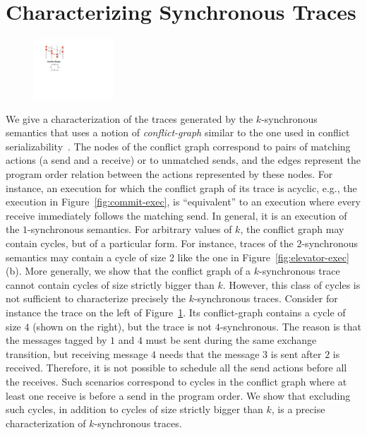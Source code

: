 \section{Characterizing Synchronous Traces}\label{sec:characterizations}

\begin{figure}
\vspace{-5mm}
\includegraphics[width=3cm]{ex-rs-cycle.pdf}
\caption{ }
\label{fig:ex-rs-cycle}
\vspace{-8mm}
\end{figure}
We give a characterization of the traces generated by the $k$-synchronous semantics that uses a notion of \emph{conflict-graph} similar to the one used in conflict serializability~\cite{journals/jacm/Papadimitriou79b}. The nodes of the conflict graph correspond to pairs of matching actions (a send and a receive) or to unmatched sends, and the edges represent the program order relation between the actions represented by these nodes. 
For instance, an execution for which the conflict graph of its trace is acyclic, e.g., the execution in Figure~\ref{fig:commit-exec}, is ``equivalent'' to an execution where every receive immediately follows the matching send. 
In general, it is an execution of the $1$-synchronous semantics. For arbitrary values of $k$, the conflict graph may contain cycles, but of a particular form. For instance, traces of the $2$-synchronous semantics may contain a cycle of size 2 like the one in Figure~\ref{fig:elevator-exec}(b). More generally, we show that the conflict graph of a $k$-synchronous trace cannot contain cycles of size strictly bigger than $k$. However, this class of cycles is not sufficient to characterize precisely the $k$-synchronous traces. Consider for instance the trace on the left of Figure~\ref{fig:ex-rs-cycle}. Its conflict-graph contains a cycle of size $4$ (shown on the right), but the trace is not $4$-synchronous. The reason is that the messages tagged by $1$ and $4$ must be sent during the same exchange transition, but receiving message $4$ needs that the message $3$ is sent after $2$ is received. Therefore, it is not possible to schedule all the send actions before all the receives. Such scenarios correspond to cycles in the conflict graph where at least one receive is before a send in the program order. We show that excluding such cycles, in addition to cycles of size strictly bigger than $k$, is a precise characterization of $k$-synchronous traces.



